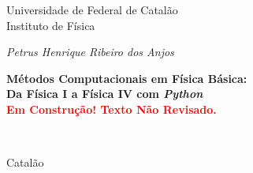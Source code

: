 	\pagestyle{empty}
	\baselineskip 0.7cm
	
	\begin{titlepage}
		\begin{center}
			
			{\large\sc Universidade de Federal de Catalão\\
				Instituto de Física}
		\end{center}
		
		\vspace{3.0cm}
		
		\begin{center}
			{\large\em Petrus Henrique Ribeiro dos Anjos}
		\end{center}
		
		\vspace{3.0cm}
		
		\begin{center}
			{\large \sc\bf  Métodos Computacionais em Física Básica:\\
			Da Física I a Física IV com {\it Python}\\
			\textcolor{red}{Em Construção! Texto Não Revisado.}}
		\end{center}
		
		
		
		\
		
		\vspace{6.0cm}
		
		\begin{center}{\large\sc Catalão}\end{center}
		\begin{center}{\large{}}\end{center}
		
	\end{titlepage}
	
	\newpage
	
	
